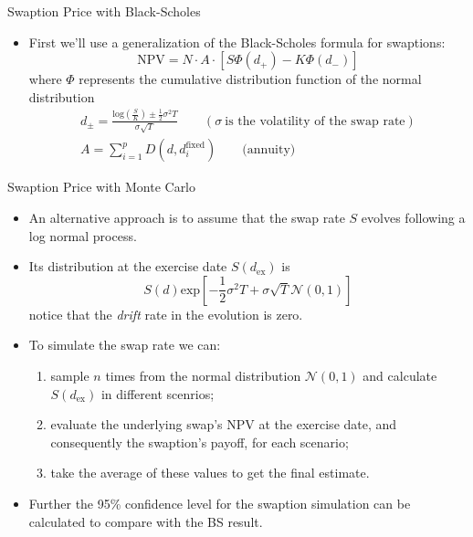 \documentclass{beamer}
\begin{document}
\begin{frame}{Swaption Price with Black-Scholes}
    \begin{itemize}	
    \item First we'll use a generalization of the Black-Scholes formula for swaptions:
    \begin{equation*}
    \mathrm{NPV} = N\cdot A\cdot [S \Phi(d_+) - K\Phi(d_-)]
    \end{equation*}
    where $\Phi$ represents the cumulative distribution function of the normal distribution
    \begin{gather*}
    d_{\pm} = \frac{\mathrm{log}(\frac{S}{K}) \pm \frac{1}{2}\sigma^{2}T}{\sigma\sqrt{T}}\qquad(\sigma~\textrm{is the volatility of the swap rate})\\
    A =\sum_{i=1}^{p}D(d, d_{i}^{\mathrm{fixed}})\qquad\mathrm{(annuity})
    \end{gather*}
    \end{itemize}
\end{frame}

\begin{frame}{Swaption Price with Monte Carlo}
    \begin{itemize}
    \item An alternative approach is to assume that the swap rate $S$ evolves following a log normal process.
    \item Its distribution at the exercise date $S(d_{\mathrm{ex}})$ is
    \begin{equation*}
    S(d)\mathrm{exp}\left[-\frac{1}{2}\sigma^{2}T+\sigma\sqrt{T}\mathcal{N}(0,1)\right]	
    \end{equation*} 
	notice that the \emph{drift} rate in the evolution is zero.
    \item To simulate the swap rate we can:
    \begin{enumerate}
    \item sample $n$ times from the normal distribution $\mathcal{N}(0, 1)$ and calculate $S(d_{\mathrm{ex}})$ in different scenrios;
    \item evaluate the underlying swap's NPV at the exercise date, and consequently the swaption's payoff, for each scenario;
    \item take the average of these values to get the final estimate.
  	\end{enumerate} 
  	\item Further the 95\% confidence level for the swaption simulation can be calculated to compare with the BS result.
    \end{itemize}
\end{frame}
\end{document}
